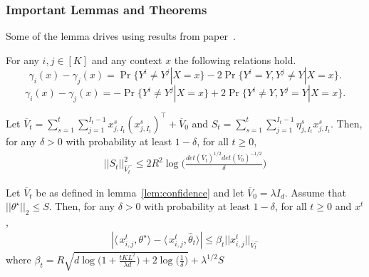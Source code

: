 \subsubsection{Important Lemmas and Theorems}
\label{sec:dma_regret_lemmas}
Some of the lemma drives using results from paper~\cite{abbasi2011improved, hanawal2017unsupervised}.
\begin{lemma}
For any $i,j \in [K] $ and any context $x$ the following relations hold.
\begin{equation}
\label{eqn:disagree1}
\gamma_i(x)-\gamma_j(x) = \Pr\{Y^i \neq Y^j|X=x\}-2\Pr\{Y^i=Y, Y^j \neq Y|X=x\}.
\end{equation}	
\begin{equation}
\label{eqn:disagree2}
\gamma_i(x)-\gamma_j(x) = -\Pr\{Y^i \neq Y^j|X=x\}+2\Pr\{Y^i \neq Y, Y^j = Y|X=x\}.
\end{equation}	
\end{lemma}
		
\begin{lemma}
	\label{lem:confidence}
	Let $\overline{V}_t = \sum_{s=1}^{t}\sum_{j=1}^{I_t-1}x_{j, I_t}^s(x_{j, I_t}^s)^\top + \overline{V}_0$ and $S_t = \sum_{s=1}^{t}\sum_{j=1}^{I_t-1}\eta_{j,I_t}^sx_{j, I_t}^s$. Then, for any $\delta > 0 $ with probability at least $1-\delta$, for all $t \geq 0$,
	\begin{align*}
	||S_t||_{\overline{V}_t^-}^2 \le 2R^2\log\bigg(\frac{det(\overline{V}_t)^{1/2}det(\overline{V}_0)^{-1/2}}{\delta}\bigg)
	\end{align*}
\end{lemma}

\begin{lemma}
	\label{lem:diff} 
	Let $\overline{V}_t$ be as defined in lemma~\ref{lem:confidence} and  let $\overline{V}_0 =\lambda I_d$. Assume that $||\theta^\star||_2 \le S$. Then, for any $\delta > 0$ with probability at least $1-\delta$, for all $t \ge 0$ and $ x^t$,
	\begin{align*}
	|\langle\,x_{i, j}^t, \theta^\star\rangle - \langle\,x_{i, j}^t, \widehat{\theta}_t\rangle|\le \beta_t||x_{i,j}^t||_{\overline{V}^-_t}
	\end{align*}
	where $\beta_t = R\sqrt{d\log\bigg(1 + \frac{tKL^2}{\lambda d}\bigg) + 2\log\bigg(\frac{1}{\delta}\bigg)} + \lambda^{1/2}S$ 
\end{lemma}

